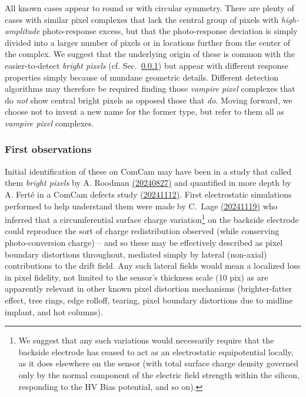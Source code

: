 All known cases appear to round or with circular symmetry. There are plenty of cases with similar pixel complexes that lack the central group of pixels with {\it high-amplitude} photo-response excess, but that the photo-response deviation is simply divided into a larger number of pixels or in locations further from the center of the complex. We suggest that the underlying origin of these is common with the easier-to-detect {\it bright pixels} (cf. Sec.~\ref{first-observations}) but appear with different response properties simply because of mundane geometric details. Different detection algorithms may therefore be required finding those {\it vampire pixel} complexes that do {\it not} show central bright pixels as opposed those that {\it do}. Moving forward, we choose not to invent a new name for the former type, but refer to them all as {\it vampire pixel} complexes.

\subsubsection{First observations}\label{first-observations}

Initial identification of these on ComCam may have been in a study that called them {\it bright pixels} by A. Roodman \href{https://confluence.slac.stanford.edu/download/attachments/209355949/Bad%20Pixels%20and%20Bright%20Spots.pdf?version=1&modificationDate=1724769154615&api=v2}{(20240827)} and quantified in more depth by A. Fert\'e in a ComCam defects study \href{https://rubin-obs.slack.com/files/U07MZAE6V3P/F080JU4CH8A/isr_science_unit_meeting__11_12_2024_-_vampire_pixels.pdf}{(20241112)}. First electrostatic simulations performed to help understand them were made by C.~Lage \href{https://confluence.slac.stanford.edu/download/attachments/209355949/Vampire_Pixel_Simulations_18Nov24.pdf?version=1&modificationDate=1731964502136&api=v2}{(20241119)} who inferred that a circumferential surface charge variation\footnote{We suggest that any such variations would necessarily require that the backside electrode has ceased to act as an electrostatic equipotential locally, as it does elsewhere on the sensor (with total surface charge density governed only by the normal component of the electric field strength within the silicon, responding to the HV Bias potential, and so on).}
on the backside electrode could reproduce the sort of charge redistribution observed (while conserving photo-conversion charge) -- and so these may be effectively described as pixel boundary distortions throughout, mediated simply by lateral (non-axial) contributions to the drift field. Any such lateral fields would mean a localized loss in pixel fidelity, not limited to the sensor's thickness scale (10 pix) as are apparently relevant in other known pixel distortion mechanisms (brighter-fatter effect, tree rings, edge rolloff, tearing, pixel boundary distortions due to midline implant, and hot columns).

